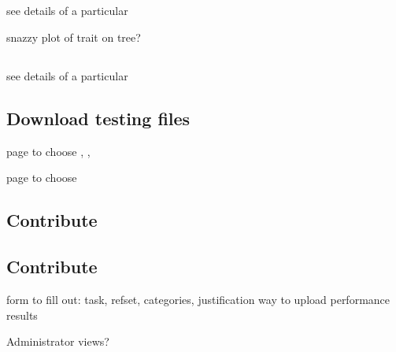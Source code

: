 \subsection{\Element}

see details of a particular \Element

snazzy plot of trait on tree?

\subsection{\Method}

see details of a particular \Method

\subsection{Download testing files}

page to choose \Elements, \Refsets, \Benchmark

page to choose \Methods

\subsection{Contribute \Element}

\subsection{Contribute \Method}

form to fill out: task, refset, categories, justification
way to upload performance results

Administrator views?
